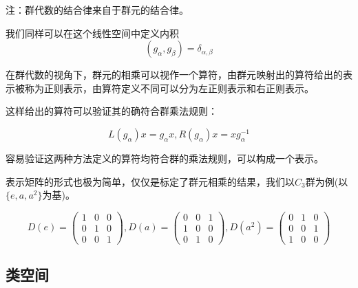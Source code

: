 注：群代数的结合律来自于群元的结合律。

我们同样可以在这个线性空间中定义内积
$$(g_\alpha,g_\beta)=\delta_{\alpha,\beta}$$

在群代数的视角下，群元的相乘可以视作一个算符，由群元映射出的算符给出的表示被称为正则表示，由算符定义不同可以分为左正则表示和右正则表示。

这样给出的算符可以验证其的确符合群乘法规则：

$$L(g_\alpha)x=g_\alpha x,R(g_\alpha)x=xg_\alpha^{-1}$$

容易验证这两种方法定义的算符均符合群的乘法规则，可以构成一个表示。

表示矩阵的形式也极为简单，仅仅是标定了群元相乘的结果，我们以$C_3$群为例(以$\{e,a,a^2\}$为基)。

$$D(e)=\begin{pmatrix}
 1& 0& 0\\
 0 &1 & 0 \\
 0&0&1
 \end{pmatrix},
 D(a)=\begin{pmatrix}
 0&0& 1\\
 1&0 & 0 \\
 0&1&0
 \end{pmatrix},
 D(a^2)=\begin{pmatrix}
 0& 1& 0\\
 0 &0 & 1 \\
 1&0&0
\end{pmatrix}$$

\subsection{类空间}

\begin{definition}{}

\end{definition}